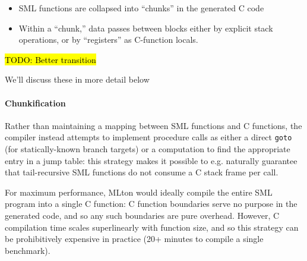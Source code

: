 \documentclass[leqno,11pt]{article}
\begin{document}

\begin{itemize}
\item SML functions are collapsed into ``chunks'' in the generated C code
\item Within a ``chunk,'' data passes between blocks either by explicit stack
  operations, or by ``registers'' as C-function locals.
\end{itemize}

\hl{TODO: Better transition}

We'll discuss these in more detail below


\paragraph{Chunkification}

Rather than maintaining a mapping between SML functions and C functions, the
compiler instead attempts to implement procedure calls as either a direct
\texttt{goto} (for statically-known branch targets) or a computation to find the
appropriate entry in a jump table: this strategy makes it possible to e.g.
naturally guarantee that tail-recursive SML functions do not consume a C stack
frame per call.

For maximum performance, MLton would ideally compile the entire SML program into
a single C function: C function boundaries serve no purpose in the generated
code, and so any such boundaries are pure overhead. However, C compilation time
scales superlinearly with function size, and so this strategy can be
prohibitively expensive in practice (20+ minutes to compile a single benchmark).
\end{document}
